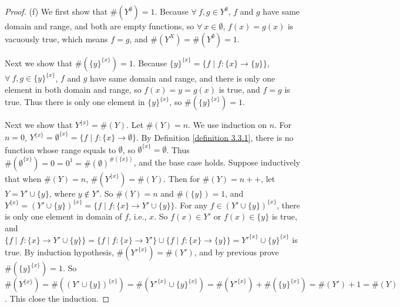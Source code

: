 \begin{proof}{(f)}
We first show that \(\#(Y^{\emptyset}) = 1\).
Because \(\forall\ f, g \in Y^{\emptyset}\), \(f\) and \(g\) have same domain and range, and both are empty functions, so \(\forall\ x \in \emptyset\), \(f(x) = g(x)\) is vacuously true, which means \(f = g\), and \(\#(Y^X) = \#(Y^{\emptyset}) = 1\).

Next we show that \(\#(\{y\}^{\{x\}}) = 1\).
Because \(\{y\}^{\{x\}} = \{f \mid f : \{x\} \to \{y\}\}\), \(\forall\ f, g \in \{y\}^{\{x\}}\), \(f\) and \(g\) have same domain and range, and there is only one element in both domain and range, so \(f(x) = y = g(x)\) is true, and \(f = g\) is true.
Thus there is only one element in \(\{y\}^{\{x\}}\), so \(\#(\{y\}^{\{x\}}) = 1\).

Next we show that \(Y^{\{x\}} = \#(Y)\).
Let \(\#(Y) = n\).
We use induction on \(n\).
For \(n = 0\), \(Y^{\{x\}} = \emptyset^{\{x\}} = \{f \mid f : \{x\} \to \emptyset\}\).
By Definition \ref{definition 3.3.1}, there is no function whose range equals to \(\emptyset\), so \(\emptyset^{\{x\}} = \emptyset\).
Thus \(\#(\emptyset^{\{x\}}) = 0 = 0^1 = \#(\emptyset)^{\#(\{x\})}\), and the base case holds.
Suppose inductively that when \(\#(Y) = n\), \(\#(Y^{\{x\}}) = \#(Y)\).
Then for \(\#(Y) = n++\), let \(Y = Y' \cup \{y\}\), where \(y \notin Y'\).
So \(\#(Y) = n\) and \(\#(\{y\}) = 1\), and \(Y^{\{x\}} = (Y' \cup \{y\})^{\{x\}} = \{f \mid f : \{x\} \to Y' \cup \{y\}\}\).
For any \(f \in (Y' \cup \{y\})^{\{x\}}\), there is only one element in domain of \(f\), i.e., \(x\).
So \(f(x) \in Y'\) or \(f(x) \in \{y\}\) is true, and \(\{f \mid f : \{x\} \to Y' \cup \{y\}\} = \{f \mid f : \{x\} \to Y'\} \cup \{f \mid f : \{x\} \to \{y\}\} = Y'^{\{x\}} \cup \{y\}^{\{x\}}\) is true.
By induction hypothesis, \(\#(Y'^{\{x\}}) = \#(Y')\), and by previous prove \(\#(\{y\}^{\{x\}}) = 1\).
So \(\#(Y^{\{x\}}) = \#((Y' \cup \{y\})^{\{x\}}) = \#(Y'^{\{x\}} \cup \{y\}^{\{x\}}) = \#(Y'^{\{x\}}) + \#(\{y\}^{\{x\}}) = \#(Y') + 1 = \#(Y)\).
This close the induction.


\end{proof}

